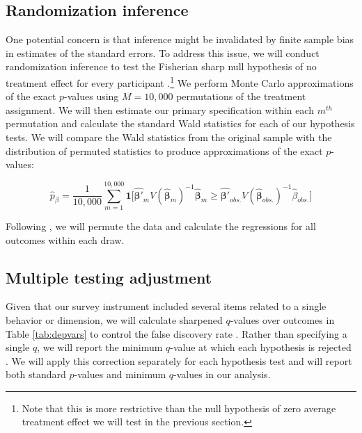 \documentclass[11pt, a4paper]{article}\usepackage[]{graphicx}\usepackage[]{color}
\begin{document}
    \subsection{Randomization inference}

        One potential concern is that inference might be invalidated by finite sample bias in estimates of the standard errors. To address this issue, we will conduct randomization inference to test the Fisherian sharp null hypothesis of no treatment effect for every participant \parencite{fisher_design_1935}.\footnote{Note that this is more restrictive than the null hypothesis of zero average treatment effect we will test in the previous section.} We perform Monte Carlo approximations of the exact $p$-values using $M=10,000$ permutations of the treatment assignment. We will then estimate our primary specification within each $m^{th}$ permutation and calculate the standard Wald statistics for each of our hypothesis tests. We will compare the Wald statistics from the original sample with the distribution of permuted statistics to produce approximations of the exact $p$-values:

        \begin{equation} \label{eq:exactp}
            \hat{p}_{\beta} =  \frac{1}{10,000}\sum_{m=1}^{10,000} \mathbf{1} \Big [ \mathbf{\hat{\beta'}}_m V(\mathbf{\hat{\beta}}_m)^{-1} \mathbf{\hat{\beta}}_m \geq \mathbf{\hat{\beta'}}_{obs.} V(\mathbf{\hat{\beta}}_{obs.})^{-1} \hat{\beta}_{obs.} \Big ]
        \end{equation}

        Following \textcite{young_channeling_2015}, we will permute the data and calculate the regressions for all outcomes within each draw.

    \subsection{Multiple testing adjustment}

        Given that our survey instrument included several items related to a single behavior or dimension, we will calculate sharpened $q$-values over outcomes in Table \ref{tab:depvars} to control the false discovery rate \parencite{benjamini_adaptive_2006}. Rather than specifying a single $q$, we will report the minimum $q$-value at which each hypothesis is rejected \parencite{anderson_multiple_2008}. We will apply this correction separately for each hypothesis test and will report both standard $p$-values and minimum $q$-values in our analysis.
\end{document}
